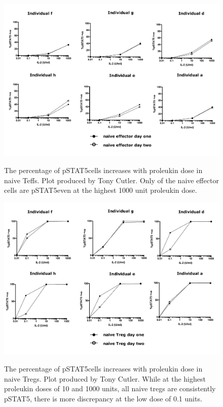 \begin{figure}
\centering
\begin{minipage}{.65\textwidth}
\includegraphics[width=\linewidth]{figures/tony-naive-eff}
\end{minipage}
\begin{minipage}{\textwidth}
{ The percentage of pSTAT5\positive cells increases with proleukin dose in naive Teffs. }
{
  Plot produced by Tony Cutler.
  Only  of the naive effector cells are pSTAT5\positive even at the highest 1000 unit proleukin dose.
}
\end{minipage}
\begin{minipage}{.65\textwidth}
\includegraphics[width=\linewidth]{figures/tony-naive-treg}
\end{minipage}
\begin{minipage}{\textwidth}
{ The percentage of pSTAT5\positive cells increases with proleukin dose in naive Tregs. }
{
  Plot produced by Tony Cutler.
  While at the highest proleukin doses of 10 and 1000 units, all naive tregs are consistently pSTAT5\positive,
  there is more discrepancy at the low dose of 0.1 units.
}
\end{minipage}
\end{figure}

